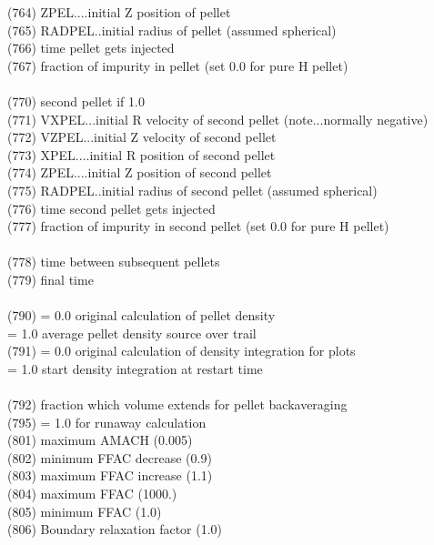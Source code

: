 \begin{tabbing}
(764) \> ZPEL....initial Z position of pellet \\
(765) \> RADPEL..initial radius of pellet (assumed spherical) \\
(766) \> time pellet gets injected \\
(767) \> fraction of impurity in pellet (set 0.0 for pure H pellet) \\
\\
(770) \> second pellet if 1.0 \\
(771) \> VXPEL...initial R velocity of second pellet (note...normally negative) \\
(772) \> VZPEL...initial Z velocity of second pellet \\
(773) \> XPEL....initial R position of second pellet \\
(774) \> ZPEL....initial Z position of second pellet \\
(775) \> RADPEL..initial radius of second pellet (assumed spherical) \\
(776) \> time second pellet gets injected \\
(777) \> fraction of impurity in second pellet (set 0.0 for pure H pellet) \\
  \\  
(778) \> time between subsequent pellets \\
(779) \> final time \\
\\
(790) \> = 0.0  \> original calculation of pellet density\\
      \> = 1.0  \> average pellet density source over trail\\
(791) \> = 0.0  \> original calculation of density integration for plots\\
      \> = 1.0  \> start density integration at restart time\\
\\
(792)  \>  fraction which volume extends for pellet backaveraging\\
(795)  \> = 1.0 for runaway calculation \\
(801)  \>  maximum AMACH (0.005)\\
(802)  \> minimum FFAC decrease (0.9)\\
(803)  \> maximum FFAC increase (1.1)\\
(804)  \> maximum FFAC (1000.)\\
(805)  \> minimum FFAC (1.0)\\  
(806)  \> Boundary relaxation factor (1.0)\\
 \\

\end{tabbing}
